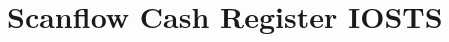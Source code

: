 \documentclass[a4paper]{report}
\begin{document}
  \chapter*{Scanflow Cash Register IOSTS}\label{app:scrp-sts}
  
\end{document}
